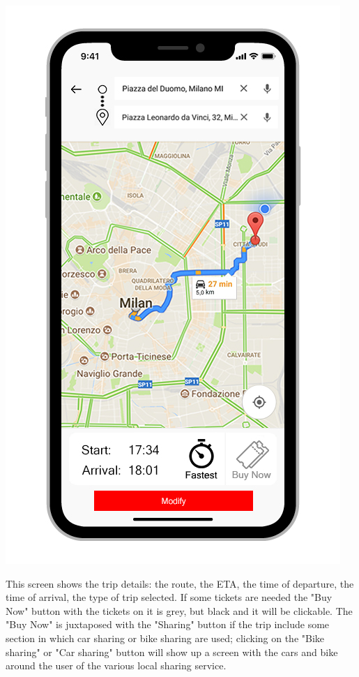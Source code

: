 \begin{center}
\includegraphics[scale=2.4]{MainMatter/images/ui/journeydetails}
\end{center}
This screen shows the trip details: the route, the ETA, the time of departure, the time of arrival, the type of trip selected. If some tickets are needed the "Buy Now" button with the tickets on it is grey, but black and it will be clickable. The "Buy Now" is juxtaposed with the "Sharing" button if the trip include some section in which car sharing or bike sharing are used; clicking on the "Bike sharing" or "Car sharing" button will show up a screen with the cars and bike around the user of the various local sharing service. \\
